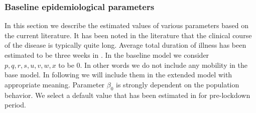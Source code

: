 \documentclass[authoryear,preprint]{elsarticle}
\begin{document}
\subsubsection{Baseline epidemiological parameters}
In this section we describe the estimated values of various parameters based on the current literature. It has been noted in the literature that the clinical course of the disease is typically quite long. Average total duration of illness has been estimated to be three weeks in \cite{Zhou2020}. In the baseline model we consider $p, q, r, s, u, v, w, x$ to be 0. In other words we do  not include any mobility in the base model. In following we will include them in the extended model with appropriate meaning. Parameter $\beta_0$ is strongly dependent on the population behavior. We select a default value that has been estimated in \cite{Shen2020.01.23.916726} for pre-lockdown period.
%
%
\end{document}
